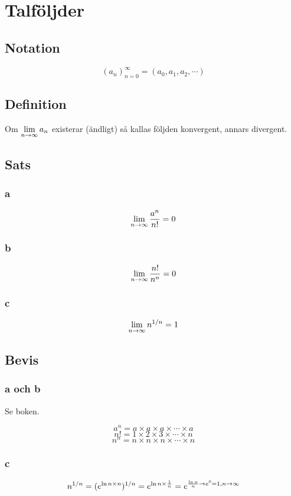 \documentclass{article}
\begin{document}
\section{Talföljder}
\subsection{Notation}
$$ (a_n)^\infty_{n=0} = (a_0, a_1, a_2, \cdots) $$

\subsection{Definition}
Om $\displaystyle \lim_{n \rightarrow \infty} a_n$ existerar (ändligt) så kallas följden konvergent, annars divergent.

\subsection{Sats}
\subsubsection{a}
$$\displaystyle \lim_{n \rightarrow \infty} \frac{a^n}{n!} = 0$$
\subsubsection{b}
$$\displaystyle \lim_{n \rightarrow \infty} \frac{n!}{n^n} = 0$$

\subsubsection{c}
$$\displaystyle \lim_{n \rightarrow \infty} n^{1/n} = 1$$

\subsection{Bevis}
\subsubsection{a och b}
Se boken.

$$ a^{n} = a\times a\times a \times \cdots \times a $$
$$ n! = 1\times 2\times 3\times \cdots\times n$$
$$ n^n = n\times n\times n\times \cdots \times n $$

\subsubsection{c}
$$ n^{1/n} = (e^{\ln n \times n})^{1/n} = e^{\ln n \times \frac{1}{n}}= e^{\frac{\ln n}{n} \to e^0 = 1, n\to \infty} $$
\end{document}
